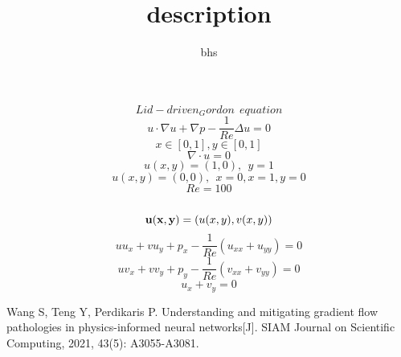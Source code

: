 \documentclass[12pt]{amsart}
\title{description}
\author{bhs}
\begin{document}
\maketitle

$$Lid-driven_Gordon \ \ equation$$
$$u \cdot \nabla u + \nabla p -\frac{1}{Re} \Delta u = 0$$
$$x\in [0,1] ,y \in [0,1]$$
$$\nabla \cdot u = 0$$
$$u(x,y) = (1,0) , \ \ y=1$$
$$u(x,y) = (0,0) , \ \ x=0,x=1,y=0$$
$$Re=100$$\\
$$\bold{u(x,y)}=(u(x,y),v(x,y))$$
$$uu_{x}+vu_{y}+p_x -\frac{1}{Re}(u_{xx}+u_{yy}) = 0$$
$$uv_{x}+vv_{y}+p_y -\frac{1}{Re}(v_{xx}+v_{yy}) = 0$$
$$u_{x}+v_{y}= 0$$


\begin{thebibliography}{10}
Wang S, Teng Y, Perdikaris P. Understanding and mitigating gradient flow pathologies in physics-informed neural networks[J]. SIAM Journal on Scientific Computing, 2021, 43(5): A3055-A3081.
\end{thebibliography}
\end{document}
